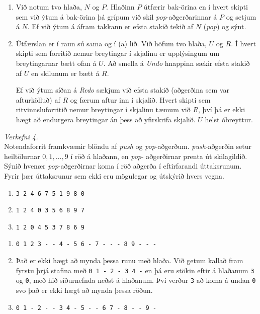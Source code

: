 \documentclass[a4paper, 12pt]{article}
\begin{document}
\begin{description}[leftmargin=!,labelwidth=\widthof{\bfseries Example:},labelindent=0em, ]
  \item[Úrlausn]
  \begin{enumerate}[label = (\alph*)]
    \item Við notum tvo hlaða, $N$ og $P$. Hlaðinn $P$ útfærir bak-örina
          en í hvert skipti sem við ýtum á bak-örina þá grípum við skil
          \emph{pop}-aðgerðarinnar á $P$ og setjum á $N$. Ef við ýtum á áfram takkann
          er efsta stakið tekið af $N$ (\emph{pop}) og sýnt.
    \item Útfærslan er í raun sú sama og í (a) lið. Við höfum tvo hlaða, $U$ og $R$. Í hvert skipti
          sem forritið nemur breytingar í skjalinu er upplýsingum um breytingarnar bætt ofan á $U$.
          Að smella á \emph{Undo} hnappinn sækir efsta stakið af $U$ en skilunum er bætt á $R$. 
          
          \medskip
          Ef við ýtum síðan á \emph{Redo} sækjum við efsta stakið (aðgerðina sem var afturkölluð) af $R$ og færum aftur inn í skjalið.
          Hvert skipti sem ritvinnsluforritið nemur breytingar í skjalinu tæmum við $R$, því þá er ekki hægt að endurgera breytingar án
          þess að yfirskrifa skjalið. $U$ helst óbreyttur.
  \end{enumerate}
\end{description}


\newpage
\noindent
\emph{Verkefni 4.} \\
Notendaforrit framkvæmir blöndu af \emph{push} og \emph{pop}-aðgerðum.  
\emph{push}-aðgerðin setur heiltölurnar $0, 1, \ldots, 9$ í röð á hlaðann, en \emph{pop}-
aðgerðirnar prenta út skilagildið.  Sýnið hvenær \emph{pop}-aðgerðirnar koma í röð aðgerða í 
eftirfarandi úttaksrunum.  Fyrir þær úttaksrunur sem ekki eru mögulegar og útskýrið hvers vegna.
\begin{enumerate}[label=(\alph*)]
  \item \texttt{3  2  4  6  7  5  1  9  8  0 }
  \item \texttt{1  2  4  0  3  5  6  8  9  7 }
  \item \texttt{1  2  0  4  5  3  7  8  6  9 }
\end{enumerate}

\begin{description}[leftmargin=!,labelwidth=\widthof{\bfseries Example:},labelindent=0em, ]
  \item[Úrlausn]
  \begin{enumerate}[label = (\alph*)]
    \item \texttt{0 1 2 3 - - 4 - 5 6 - 7 - - - 8 9 - - -}
    \item Það er ekki hægt að mynda þessa runu með hlaða. Við getum kallað fram
          fyrstu þrjá stafina með \texttt{0 1 - 2 - 3 4 -} en þá eru stökin eftir
          á hlaðanum \texttt{3} og \texttt{0}, með hið síðurnefnda neðst á hlaðanum.
          Því verður \texttt{3} að koma á undan \texttt{0} svo það er ekki hægt að
          mynda þessa röðun.
    \item \texttt{0 1 - 2 - - 3 4 - 5 - - 6 7 - 8 - - 9 -}
  \end{enumerate}
\end{description}
\end{document}
